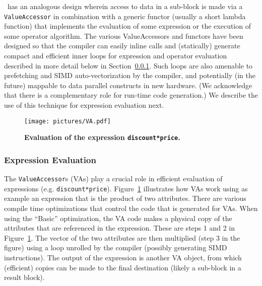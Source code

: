 \Quickstep\ has an analogous design wherein access to data in a sub-block is made via a \texttt{ValueAccessor} in combination with a generic functor (usually a short lambda function) that implements the evaluation of some expression or the execution of some operator algorithm. The various ValueAccessors and functors have been designed so that the compiler can easily inline calls and (statically) generate compact and efficient inner loops for expression and operator evaluation described in more detail below in Section~\ref{ssec:expression-eval}. Such loops are also amenable to prefetching and SIMD auto-vectorization by the compiler, and potentially (in the future) mappable to data parallel constructs in new hardware. (We acknowledge that there is a complementary role for run-time code generation.) We describe the use of this technique for expression evaluation next.


\begin{figure}
\centering
   \texttt{[image: pictures/VA.pdf]}
   \caption{\textbf{Evaluation of the expression \texttt{discount*price}.}}
   \label{fig-template-VA}
\end{figure}


\subsubsection{Expression Evaluation}\label{ssec:expression-eval}
The \texttt{ValueAccessor}s (VAs) play a crucial role in efficient evaluation of expressions (e.g. \texttt{discount*price}). Figure~\ref{fig-template-VA} illustrates how VAs work using as example an expression that is the product of two attributes. There are  various compile time optimizations that control the code that is generated for VAs. When using the ``Basic'' optimization, the VA code makes a physical copy of the attributes that are referenced in the expression. These are steps 1 and 2 in Figure~\ref{fig-template-VA}. The vector of the two attributes are then multiplied (step 3 in the figure) using a loop unrolled by the compiler (possibly generating SIMD instructions).  The output of the expression is another VA object, from which (efficient) copies can be made to the final destination (likely a sub-block in a result block).

